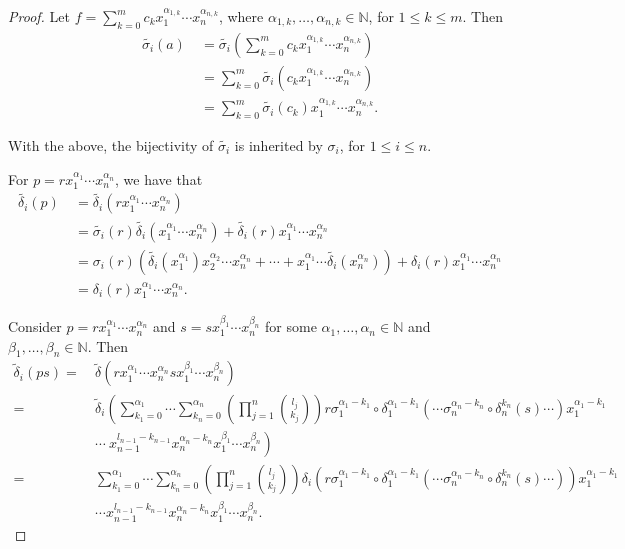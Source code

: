 \documentclass{amsart}
\theoremstyle{definition}
\theoremstyle{remark}
\numberwithin{equation}{section}
\begin{document}
\begin{proof}
Let $f = \displaystyle\sum_{k=0}^mc_kx_1^{\alpha_{1,k}}\cdots x_n^{\alpha_{n,k}}$, where $\alpha_{1,k}, \ldots, \alpha_{n,k}\in\mathbb{N}$, for $1\leq k \leq m$. Then
\begin{align*}
   \widetilde{\sigma_i}(a) &\ =\widetilde{\sigma_i}\left(\displaystyle\sum_{k=0}^mc_kx_1^{\alpha_{1,k}}\cdots x_n^{\alpha_{n,k}}\right) \\
   &\ =\displaystyle\sum_{k=0}^m\widetilde{\sigma_i}\left(c_kx_1^{\alpha_{1,k}}\cdots x_n^{\alpha_{n,k}}\right) \\
   &\ =\displaystyle\sum_{k=0}^m\widetilde{\sigma_i}\left(c_k\right)x_1^{\alpha_{1,k}}\cdots x_n^{\alpha_{n,k}}. 
\end{align*}

With the above, the bijectivity of $\widetilde{\sigma_i}$ is inherited by $\sigma_i$, for $1\leq i \leq n$.

For $p=rx_1^{\alpha_{1}}\cdots x_n^{\alpha_{n}}$, we have that
\begin{align*}
     \widetilde{\delta_i}(p)&\ =\widetilde{\delta_i}(rx_1^{\alpha_{1}}\cdots x_n^{\alpha_{n}}) \\ 
     &\ =\widetilde{\sigma_i}(r)\widetilde{\delta_i}(x_1^{\alpha_{1}}\cdots x_n^{\alpha_{n}})+\widetilde{\delta_i}(r)x_1^{\alpha_{1}}\cdots x_n^{\alpha_{n}} \\
     &\ = \sigma_i(r)\left(\widetilde{\delta_i}(x_1^{\alpha_{1}})x_2^{\alpha_{2}}\cdots x_n^{\alpha_{n}}+\cdots + x_1^{\alpha_{1}}\cdots\widetilde{\delta_i}(x_n^{\alpha_{n}})\right)+\delta_i(r)x_1^{\alpha_{1}}\cdots x_n^{\alpha_{n}} \\
     &\ = \delta_i(r)x_1^{\alpha_{1}}\cdots x_n^{\alpha_{n}}.
\end{align*}

Consider $p=rx_1^{\alpha_{1}}\cdots x_n^{\alpha_{n}}$ and $s=sx_1^{\beta_{1}}\cdots x_n^{\beta_{n}}$ for some $\alpha_{1},\ldots, \alpha_{n}\in \mathbb{N}$ and $\beta_{1}, \ldots, \beta_{n} \in \mathbb{N}$. Then
{\footnotesize{
    \begin{align*}
    \widetilde{\delta}_i(ps) = &\ \widetilde{\delta}(rx_1^{\alpha_{1}}\cdots x_n^{\alpha_{n}}sx_1^{\beta_{1}}\cdots x_n^{\beta_{n}}) \\
    = &\ \widetilde{\delta}_i\left(\sum_{k_1=0}^{\alpha_{1}}\cdots\sum_{k_n=0}^{\alpha_{n}}\left(\prod_{j=1}^{n}\binom{l_j}{k_j}\right)r\sigma_1^{\alpha_{1}-k_1}\circ \delta_1^{\alpha_{1}-k_1}\left(\cdots\sigma_{n}^{\alpha_{n}-k_n}\circ\delta_n^{k_n}(s)\cdots\right)x_1^{\alpha_{1}-k_1} \right. 
    \\
    &\ \left. \cdots \ x_{n-1}^{l_{n-1}-k_{n-1}}x_n^{\alpha_{n}-k_n}x_1^{\beta_{1}}\cdots x_n^{\beta_{n}}\right) \\
     = &\ \sum_{k_1=0}^{\alpha_{1}}\cdots\sum_{k_n=0}^{\alpha_{n}}\left(\prod_{j=1}^{n}\binom{l_j}{k_j}\right)\delta_i\left(r\sigma_1^{\alpha_{1}-k_1}\circ \delta_1^{\alpha_{1}-k_1}\left(\cdots\sigma_{n}^{\alpha_{n}-k_n}\circ\delta_n^{k_n}(s)\cdots\right)\right)x_1^{\alpha_{1}-k_1} \\
     &\ \cdots x_{n-1}^{l_{n-1}-k_{n-1}}x_n^{\alpha_{n}-k_n}x_1^{\beta_{1}}\cdots x_n^{\beta_{n}}. 
    \end{align*}
}}


\end{proof}
\end{document}
